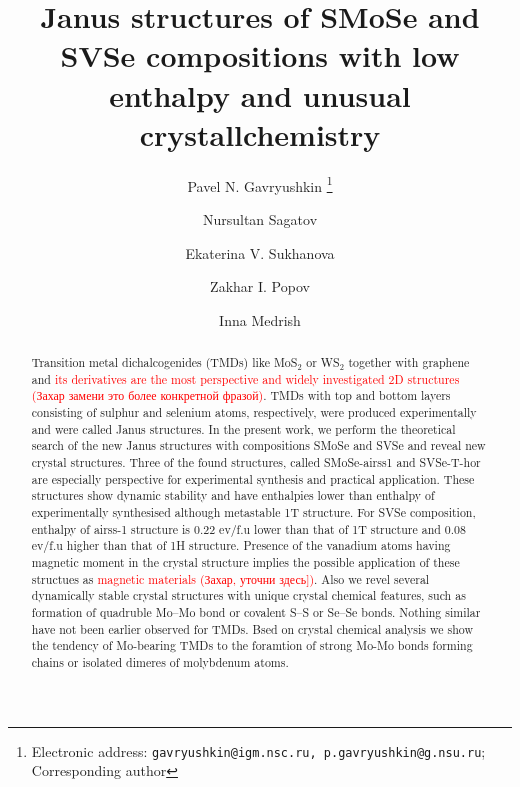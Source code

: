 \documentclass[a4paperm]{article}
\begin{document}

\title{Janus structures of SMoSe and SVSe compositions with low enthalpy and unusual crystallchemistry}


\author[1,2,3]{Pavel N. Gavryushkin
   \thanks{Electronic address: \texttt{gavryushkin@igm.nsc.ru, p.gavryushkin@g.nsu.ru}; Corresponding author}}     
\author[2]{Nursultan Sagatov}
\author[1]{Ekaterina V. Sukhanova}
\author[1]{Zakhar I. Popov}
\author[4]{Inna Medrish}



\date{}
\maketitle


\begin{abstract}
Transition metal dichalcogenides (TMDs) like MoS$_2$ or WS$_2$ together with graphene and \textcolor{red}{its derivatives are the most perspective and widely investigated 2D structures (Захар замени это более конкретной фразой)}.
TMDs with top and bottom layers consisting of sulphur and selenium atoms, respectively, were produced experimentally and were called Janus structures.
In the present work, we perform the theoretical search of the new Janus structures with compositions SMoSe and SVSe and reveal new crystal structures.
Three of the found structures, called SMoSe-airss1 and SVSe-T-hor are especially perspective for experimental synthesis and practical application.
These structures show dynamic stability and have enthalpies lower than enthalpy of experimentally synthesised although metastable 1T structure.
For  SVSe composition, enthalpy of airss-1 structure is 0.22 ev/f.u lower than that of 1T structure and 0.08  ev/f.u higher than that of  1H structure.
Presence of the vanadium atoms having magnetic moment in the crystal structure implies the possible application of these structues as \textcolor{red}{magnetic materials (Захар, уточни здесь])}.
Also we revel several dynamically stable crystal structures with unique crystal chemical features, such as formation of quadruble Mo--Mo bond or covalent S--S or Se--Se bonds.
Nothing similar have not been earlier observed for TMDs.
Bsed on crystal chemical analysis we show the tendency of Mo-bearing TMDs to the foramtion of strong Mo-Mo bonds forming chains or isolated  dimeres of molybdenum atoms.

\end{abstract}
\end{document}
